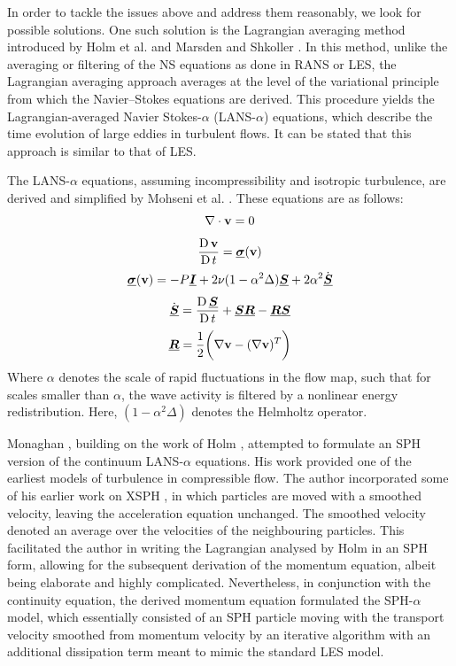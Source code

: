 In order to tackle the issues above and address them reasonably, we look for possible solutions. One such solution is the Lagrangian averaging method introduced by Holm et al. \parencite{holm1998euler} and Marsden and Shkoller \parencite{Marsden2001}. In this method, unlike the averaging or filtering of the NS equations as done in RANS or LES, the Lagrangian averaging approach averages at the level of the variational principle from which the Navier–Stokes equations are derived. This procedure yields the Lagrangian-averaged Navier Stokes-$\alpha$ (LANS-$\alpha$) equations, which describe the time evolution of large eddies in turbulent flows. It can be stated that this approach is similar to that of LES.

The LANS-$\alpha$ equations, assuming incompressibility and isotropic turbulence, are derived and simplified by Mohseni et al. \parencite{Mohseni2003}. These equations are as follows:
\begin{equation}
    \nabla \cdot \mathbf{v} = 0
\end{equation}
\begin{equation}
    \frac{\operatorname{D} \mathbf{v}}{\operatorname{D} t} = \underline{\bm{\sigma}}(\mathbf{v})
\end{equation}
\begin{equation}
    \underline{\bm{\sigma}}(\mathbf{v}) = -P\underline{\bm{I}} + 2\nu(1 - \alpha^2\Delta)\underline{\bm{S}} + 2\alpha^2\Dot{\underline{\bm{S}}}
\end{equation}
\begin{equation}
    \Dot{\underline{\bm{S}}} = \frac{\operatorname{D} \underline{\bm{S}}}{\operatorname{D} t} + \underline{\bm{S}}\underline{\bm{R}} - \underline{\bm{R}}\underline{\bm{S}}
\end{equation}
\begin{equation}
    \underline{\bm{R}} = \frac{1}{2}\bigg(\nabla\mathbf{v}-(\nabla\mathbf{v})^T\bigg)
\end{equation}
Where $\alpha$ denotes the scale of rapid fluctuations in the flow map, such that for scales smaller than $\alpha$, the wave activity is filtered by a nonlinear energy redistribution. Here, $(1 - \alpha^2 \Delta)$ denotes the Helmholtz operator.

Monaghan \parencite{Monaghan2002}, building on the work of Holm \parencite{holm1998euler}, attempted to formulate an SPH version of the continuum LANS-$\alpha$ equations. His work provided one of the earliest models of turbulence in compressible flow. The author incorporated some of his earlier work on XSPH \parencite{monaghan1989problem}, in which particles are moved with a smoothed velocity, leaving the acceleration equation unchanged. The smoothed velocity denoted an average over the velocities of the neighbouring particles. This facilitated the author in writing the Lagrangian analysed by Holm in an SPH form, allowing for the subsequent derivation of the momentum equation, albeit being elaborate and highly complicated. Nevertheless, in conjunction with the continuity equation, the derived momentum equation formulated the SPH-$\alpha$ model, which essentially consisted of an SPH particle moving with the transport velocity smoothed from momentum velocity by an iterative algorithm with an additional dissipation term meant to mimic the standard LES model.

